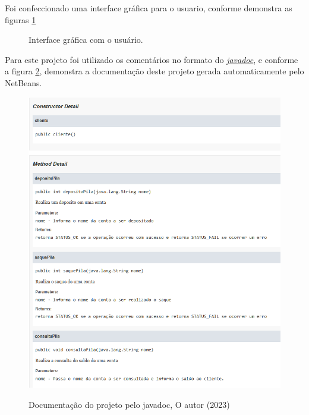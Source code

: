 \par Foi confeccionado uma interface gráfica para o usuario, conforme demonstra as figuras \ref{fig:face}

\begin{figure}[h!]
  \centering
  \caption{Interface gráfica com o usuário.}\label{fig:face}
\end{figure}




\par Para este projeto foi utilizado os comentários no formato do \href{https://docs.oracle.com/javase/8/docs/technotes/tools/windows/javadoc.html}{\textit{javadoc}}, e conforme a figura \ref{fig:javadoc}, demonstra a documentação deste projeto gerada automaticamente pelo NetBeans.

\begin{figure}[h!]
  \centering
  \includegraphics[width=\textwidth]{figure/java_doc.png}
  \label{fig:javadoc}
  \caption{Documentação do projeto pelo javadoc, O autor (2023)}
\end{figure}


